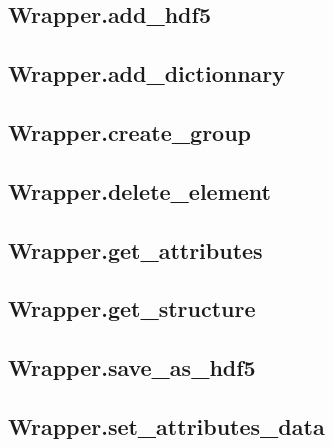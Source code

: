 
\subsection{Wrapper.add\_hdf5} \label{subsec:wrapper.add_hdf5}
    

\subsection{Wrapper.add\_dictionnary} \label{subsec:wrapper.add_dictionnary}
    

\subsection{Wrapper.create\_group} \label{subsec:wrapper.create_group}
    

\subsection{Wrapper.delete\_element} \label{subsec:wrapper.delete_element}
    

\subsection{Wrapper.get\_attributes} \label{subsec:wrapper.get_attributes}
        

\subsection{Wrapper.get\_structure} \label{subsec:wrapper.get_structure}
       

\subsection{Wrapper.save\_as\_hdf5} \label{subsec:wrapper.save_as_hdf5}
    

\subsection{Wrapper.set\_attributes\_data} \label{subsec:wrapper.set_attributes_data}
    
